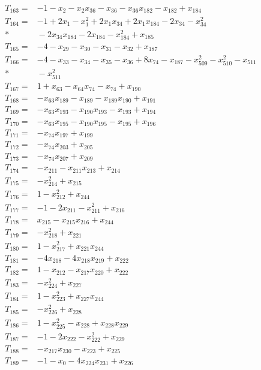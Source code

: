 \begin{align*}
T_{163}={}&-1-x_{2}-x_{2}x_{36}-x_{36}-x_{36}x_{182}-x_{182}+x_{184}\\[3pt]
T_{164}={}&-1+2x_{1}-x_{1}^{2}+2x_{1}x_{34}+2x_{1}x_{184}-2x_{34}-x_{34}^{2}\\*
&{}-2x_{34}x_{184}-2x_{184}-x_{184}^{2}+x_{185}\\[3pt]
T_{165}={}&-4-x_{29}-x_{30}-x_{31}-x_{32}+x_{187}\\[3pt]
T_{166}={}&-4-x_{33}-x_{34}-x_{35}-x_{36}+8x_{74}-x_{187}-x_{509}^{2}-x_{510}^{2}-x_{511}\\*
&{}-x_{511}^{2}\\[3pt]
T_{167}={}&1+x_{63}-x_{64}x_{74}-x_{74}+x_{190}\\[3pt]
T_{168}={}&-x_{63}x_{189}-x_{189}-x_{189}x_{190}+x_{191}\\[3pt]
T_{169}={}&-x_{63}x_{193}-x_{190}x_{193}-x_{193}+x_{194}\\[3pt]
T_{170}={}&-x_{63}x_{195}-x_{190}x_{195}-x_{195}+x_{196}\\[3pt]
T_{171}={}&-x_{74}x_{197}+x_{199}\\[3pt]
T_{172}={}&-x_{74}x_{203}+x_{205}\\[3pt]
T_{173}={}&-x_{74}x_{207}+x_{209}\\[3pt]
T_{174}={}&-x_{211}-x_{211}x_{213}+x_{214}\\[3pt]
T_{175}={}&-x_{214}^{2}+x_{215}\\[3pt]
T_{176}={}&1-x_{212}^{2}+x_{244}\\[3pt]
T_{177}={}&-1-2x_{211}-x_{211}^{2}+x_{216}\\[3pt]
T_{178}={}&x_{215}-x_{215}x_{216}+x_{244}\\[3pt]
T_{179}={}&-x_{218}^{2}+x_{221}\\[3pt]
T_{180}={}&1-x_{217}^{2}+x_{221}x_{244}\\[3pt]
T_{181}={}&-4x_{218}-4x_{218}x_{219}+x_{222}\\[3pt]
T_{182}={}&1-x_{212}-x_{217}x_{220}+x_{222}\\[3pt]
T_{183}={}&-x_{224}^{2}+x_{227}\\[3pt]
T_{184}={}&1-x_{223}^{2}+x_{227}x_{244}\\[3pt]
T_{185}={}&-x_{226}^{2}+x_{228}\\[3pt]
T_{186}={}&1-x_{225}^{2}-x_{228}+x_{228}x_{229}\\[3pt]
T_{187}={}&-1-2x_{222}-x_{222}^{2}+x_{229}\\[3pt]
T_{188}={}&-x_{217}x_{230}-x_{223}+x_{225}\\[3pt]
T_{189}={}&-1-x_{0}-4x_{224}x_{231}+x_{226}\\[3pt]

\end{align*}
